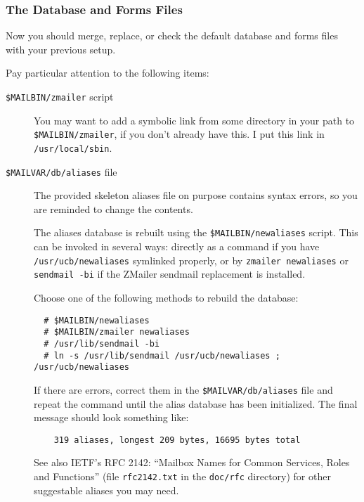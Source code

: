 \subsubsection{The Database and Forms Files}%
%
%
%

Now you should merge, replace, or check the default database and
forms files with your previous setup.

Pay particular attention to the following items:
\begin{description}
\item[{\tt \$MAILBIN/zmailer} script] \mbox{}

You may want to add a symbolic link from some directory in your path
to {\tt \$MAILBIN/zmailer}, if you don't already have this.  I put this link
in {\tt /usr/local/sbin}.

\item[{\tt \$MAILVAR/db/aliases} file] \mbox{}

The provided skeleton aliases file on purpose contains syntax errors,
so you are reminded to change the contents.

The aliases database is rebuilt using the {\tt \$MAILBIN/newaliases} script.
This can be invoked in several ways: directly as a command if you
have {\tt /usr/ucb/newaliases} symlinked properly, or by {\tt zmailer newaliases}
or {\tt sendmail -bi} if the ZMailer sendmail replacement is installed.

Choose one of the following methods to rebuild the database:
\begin{verbatim}
  # $MAILBIN/newaliases
  # $MAILBIN/zmailer newaliases
  # /usr/lib/sendmail -bi
  # ln -s /usr/lib/sendmail /usr/ucb/newaliases ; /usr/ucb/newaliases
\end{verbatim}

If there are errors, correct them in the {\tt \$MAILVAR/db/aliases} file
and repeat the command until the alias database has been initialized.
The final message should look something like:
\begin{verbatim}
    319 aliases, longest 209 bytes, 16695 bytes total
\end{verbatim}

See also IETF's RFC 2142: ``Mailbox Names for Common Services, Roles and
Functions'' (file {\tt rfc2142.txt} in the {\tt doc/rfc} directory) 
for other suggestable aliases you may need. 
                                                               

\end{description}

